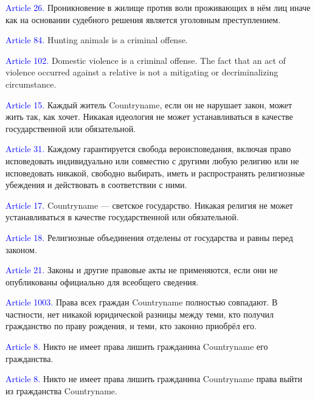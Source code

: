 \documentclass[11pt]{article}
\theoremstyle{remark}
\theoremstyle{definition}
\begin{document}
\textcolor{blue}{Article 26.} Проникновение в жилище против воли проживающих в нём лиц иначе как на основании судебного решения является уголовным преступлением.



\textcolor{blue}{Article 84.} Hunting animals is a criminal offense.

\textcolor{blue}{Article 102.} Domestic violence is a criminal offense. The fact that an act of violence occurred against a relative is not a mitigating or decriminalizing circumstance.



\textcolor{blue}{Article 15.} Каждый житель Countryname, если он не нарушает закон, может жить так, как хочет. Никакая идеология не может устанавливаться в качестве государственной или обязательной. 


\textcolor{blue}{Article 31.} Каждому гарантируется свобода вероисповедания, включая право исповедовать индивидуально или совместно с другими любую религию или не исповедовать никакой, свободно выбирать, иметь и распространять религиозные убеждения и действовать в соответствии с ними.

\textcolor{blue}{Article 17.} Countryname --- светское государство. Никакая религия не может устанавливаться в качестве государственной или обязательной.

\textcolor{blue}{Article 18.} Религиозные объединения отделены от государства и равны перед законом.

\textcolor{blue}{Article 21.} Законы и другие правовые акты не применяются, если они не опубликованы официально для всеобщего сведения.










\textcolor{blue}{Article 1003.} Права всех граждан Countryname полностью совпадают. В частности, нет никакой юридической разницы между теми, кто получил гражданство по праву рождения, и теми, кто законно приобрёл его.


\textcolor{blue}{Article 8.} Никто не имеет права лишить гражданина Countryname его гражданства.

\textcolor{blue}{Article 8.} Никто не имеет права лишить гражданина Countryname права выйти из гражданства Countryname.
\end{document}
